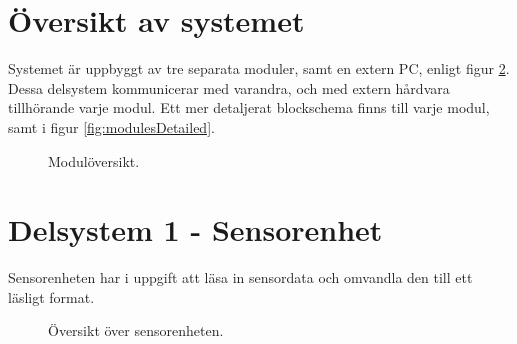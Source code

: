 \documentclass[a4paper,11pt]{article}
\begin{document}
\newpage
\section{Översikt av systemet}
Systemet är uppbyggt av tre separata moduler, samt en extern PC, enligt figur \ref{fig:modules}. Dessa delsystem kommunicerar med varandra, och med extern hårdvara tillhörande varje modul. Ett mer detaljerat blockschema finns till varje modul, samt i figur \ref{fig:modulesDetailed}.
\begin{figure}[h!]
    \caption{Modulöversikt.}
    \label{fig:modules}
\end{figure}

\newpage
\section{Delsystem 1 - Sensorenhet}
Sensorenheten har i uppgift att läsa in sensordata och omvandla den till ett läsligt format.
\begin{figure}[h!]
    \caption{Översikt över sensorenheten.}
    \label{fig:modules}
\end{figure}
\end{document}

